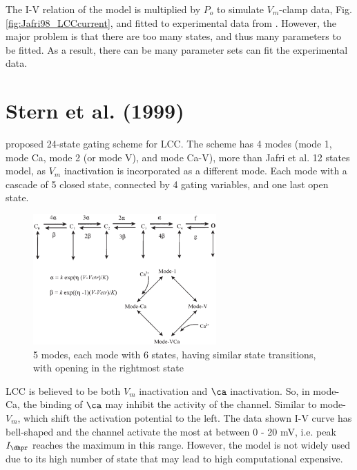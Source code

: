 The I-V relation of the model is multiplied by $P_o$ to simulate $V_m$-clamp
data, Fig.\ref{fig:Jafri98_LCCcurrent}, and fitted to experimental data from
\citep{mcdonald1986}. However, the major problem is that there are too many
states, and thus many parameters to be fitted. As a result, there can be many
parameter sets can fit the experimental data.

\section{Stern et al. (1999)}
\label{sec:LCC_stern1999}

\citep{stern1999lcm} proposed 24-state gating scheme for LCC. The
scheme has 4 modes (mode 1, mode Ca, mode 2 (or mode V), and mode
Ca-V), more than Jafri et al. 12 states model, as $V_m$ inactivation
is incorporated as a different mode. Each mode with a cascade of 5 closed state,
connected by 4 gating variables, and one last open state.

\begin{figure}[hbt]
  \centerline{\includegraphics[height=5cm,
    angle=0]{./images/Stern_24st_LCC.eps}}
  \caption{5 modes, each mode with 6 states, having similar state
    transitions, with opening in the rightmost state}
\label{fig:Stern_24stateLCC}
\end{figure}


LCC is believed to be both $V_m$ inactivation and $\ca$ inactivation. So, in
mode-Ca, the binding of $\ca$ may inhibit the activity of the channel. Similar
to mode-$V_m$, which shift the activation potential to the left. The data shown
I-V curve has bell-shaped and the channel activate the most at between 0 - 20
mV, i.e. peak $I_\dhpr$ reaches the maximum in this range. However, the model is
not widely used due to its high number of state that may lead to high
computational expensive.


